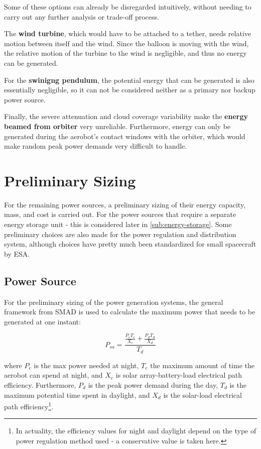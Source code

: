 Some of these options can already be disregarded intuitively, without needing to carry out any further analysis or trade-off process. 

The \textbf{wind turbine}, which would have to be attached to a tether, needs relative motion between itself and the wind. Since the balloon is moving with the wind, the relative motion of the turbine to the wind is negligible, and thus no energy can be generated.

For the \textbf{swinigng pendulum}, the potential energy that can be generated is also essentially negligible, so it can not be considered neither as a primary nor backup power source.

Finally, the severe attenuation and cloud coverage variability make the \textbf{energy beamed from orbiter} very unreliable. Furthermore, energy can only be generated during the aerobot's contact windows with the orbiter, which would make random peak power demands very difficult to handle.

\section{Preliminary Sizing}
For the remaining power sources, a preliminary sizing of their energy capacity, mass, and cost is carried out. For the power sources that require a separate energy storage unit - this is considered later in \autoref{sub:energy-storage}. Some preliminary choices are also made for the power regulation and distribution system, although choices have pretty much been standardized for small spacecraft by ESA.
\subsection{Power Source}
For the preliminary sizing of the power generation systems, the general framework from SMAD is used to calculate the maximum power that needs to be generated at one instant:

\begin{equation}
    P_{sa} = \frac{\frac{P_{e}T_{e}}{X_{e}}+\frac{P_{d}T_{d}}{X_{d}}}{T_{d}}    
\end{equation}

where $P_{e}$ is the max power needed at night, $T_{e}$ the maximum amount of time the aerobot can spend at night, and $X_{e}$ is solar array-battery-load electrical path efficiency.  Furthermore, $P_{d}$ is the peak power demand during the day, $T_{d}$ is the maximum potential time spent in daylight, and $X_{d}$ is the solar-load electrical path efficiency\footnote{In actuality, the efficiency values for night and daylight depend on the type of power regulation method used - a conservative value is taken here.}.

